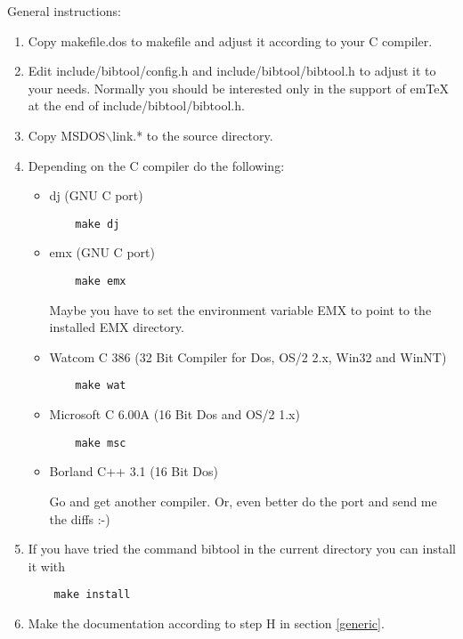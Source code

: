 \documentclass[11pt,a4paper]{scrartcl}
\newcommand\file[1]{\textsf{#1}}
\newcommand\BS{\(\backslash\)}
\begin{document}
General instructions:

\begin{enumerate}
\item Copy \file{makefile.dos} to \file{makefile} and adjust it
  according to your C compiler.
  
\item Edit \file{include/bibtool/config.h} and
  \file{include/bibtool/bibtool.h} to adjust it to your needs.
  Normally you should be interested only in the support of em\TeX{} at
  the end of \file{include/bibtool/bibtool.h}.
  
\item Copy MSDOS\BS link.* to the source directory.
  
\item Depending on the C compiler do the following:

    \begin{itemize}
    \item dj (GNU C port)

\begin{verbatim}
	make dj
\end{verbatim}

    \item emx (GNU C port)

\begin{verbatim}
	make emx
\end{verbatim}

      Maybe you have to set the environment variable EMX to point to the 
      installed EMX directory.

    \item Watcom C 386 (32 Bit Compiler for Dos, OS/2 2.x, Win32 and WinNT)

\begin{verbatim}
	make wat
\end{verbatim}

    \item Microsoft C 6.00A (16 Bit Dos and OS/2 1.x)

\begin{verbatim}
	make msc
\end{verbatim}

    \item Borland C++ 3.1 (16 Bit Dos)

	Go and get another compiler. 
	Or, even better do the port and send me the diffs :-)
    \end{itemize}

\item 
    If you have tried the command bibtool in the current directory
    you can install it with

\begin{verbatim}
	make install
\end{verbatim}

\item 
    Make the documentation according to step H in section \ref{generic}.
\end{enumerate}
\end{document}
